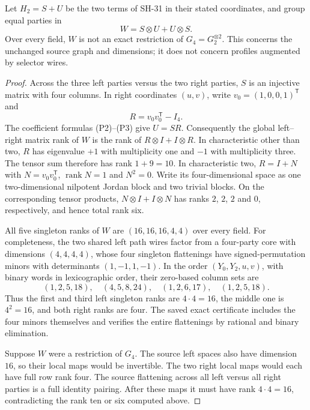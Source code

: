 \begin{proposition}
\label{prop:pentagon-profile-obstruction}
Let $H_2=S+U$ be the two terms of SH-31 in their stated
coordinates, and group equal parties in
\[
 W=S\otimes U+U\otimes S.
\]
Over every field, $W$ is not an exact restriction of
$G_4=G_2^{\otimes2}$.
This concerns the unchanged source graph and dimensions;
it does not concern profiles augmented by selector wires.
\end{proposition}
\begin{proof}
Across the three left parties versus the two right
parties, $S$ is an injective matrix with four columns.
In right coordinates $(u,v)$, write
$v_0=(1,0,0,1)^{\mathsf T}$ and
\[
 R=v_0v_0^{\mathsf T}-I_4.
\]
The coefficient formulas (P2)--(P3) give $U=SR$.
Consequently the global left--right matrix rank of $W$
is the rank of $R\otimes I+I\otimes R$.
In characteristic other than two, $R$ has eigenvalue
$+1$ with multiplicity one and $-1$ with multiplicity
three.  The tensor sum therefore has rank $1+9=10$.
In characteristic two, $R=I+N$ with
$N=v_0v_0^{\mathsf T}$, $\operatorname{rank}N=1$
and $N^2=0$.  Write its four-dimensional space as one
two-dimensional nilpotent Jordan block and two trivial
blocks.  On the corresponding tensor products,
$N\otimes I+I\otimes N$ has ranks $2$, $2$, $2$ and
$0$, respectively, and hence total rank six.

All five singleton ranks of $W$ are
$(16,16,16,4,4)$ over every field.  For completeness,
the two shared left path wires factor from a four-party
core with dimensions $(4,4,4,4)$, whose four singleton
flattenings have signed-permutation minors with
determinants $(1,-1,1,-1)$.  In the order
$(Y_0,Y_2,u,v)$, with binary words in lexicographic
order, their zero-based column sets are
\[
 (1,2,5,18),\quad(4,5,8,24),\quad
 (1,2,6,17),\quad(1,2,5,18).
\]
Thus the first and third left singleton ranks are
$4\cdot4=16$, the middle one is $4^2=16$, and both
right ranks are four.  The saved exact certificate
includes the four minors themselves and verifies the
entire flattenings by rational and binary elimination.

Suppose $W$ were a restriction of $G_4$.  The source
left spaces also have dimension $16$, so their local
maps would be invertible.  The two right local maps
would each have full row rank four.  The source
flattening across all left versus all right parties is
a full identity pairing.  After these maps it must have
rank $4\cdot4=16$, contradicting the rank ten or six
computed above.
\end{proof}

